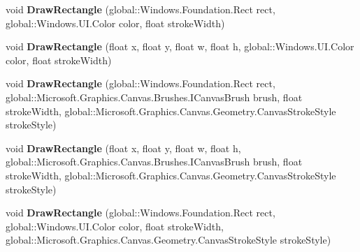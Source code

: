 \begin{DoxyCompactItemize}
\mbox{\label{class_microsoft_1_1_graphics_1_1_canvas_1_1_canvas_drawing_session_a02eb48c19bee3958a06857db78ccc690}} 
void {\bfseries Draw\+Rectangle} (global\+::\+Windows.\+Foundation.\+Rect rect, global\+::\+Windows.\+U\+I.\+Color color, float stroke\+Width)
\item 
\mbox{\label{class_microsoft_1_1_graphics_1_1_canvas_1_1_canvas_drawing_session_a28a64f9f29f0edaaa2016023bf267d2e}} 
void {\bfseries Draw\+Rectangle} (float x, float y, float w, float h, global\+::\+Windows.\+U\+I.\+Color color, float stroke\+Width)
\item 
\mbox{\label{class_microsoft_1_1_graphics_1_1_canvas_1_1_canvas_drawing_session_a77c25d21ef99cb3a408ceec333dd119b}} 
void {\bfseries Draw\+Rectangle} (global\+::\+Windows.\+Foundation.\+Rect rect, global\+::\+Microsoft.\+Graphics.\+Canvas.\+Brushes.\+I\+Canvas\+Brush brush, float stroke\+Width, global\+::\+Microsoft.\+Graphics.\+Canvas.\+Geometry.\+Canvas\+Stroke\+Style stroke\+Style)
\item 
\mbox{\label{class_microsoft_1_1_graphics_1_1_canvas_1_1_canvas_drawing_session_af4a31d2b87f5a4e8de01db53ff030ac7}} 
void {\bfseries Draw\+Rectangle} (float x, float y, float w, float h, global\+::\+Microsoft.\+Graphics.\+Canvas.\+Brushes.\+I\+Canvas\+Brush brush, float stroke\+Width, global\+::\+Microsoft.\+Graphics.\+Canvas.\+Geometry.\+Canvas\+Stroke\+Style stroke\+Style)
\item 
\mbox{\label{class_microsoft_1_1_graphics_1_1_canvas_1_1_canvas_drawing_session_a1df54d826ccf73b48a197a79d4dab761}} 
void {\bfseries Draw\+Rectangle} (global\+::\+Windows.\+Foundation.\+Rect rect, global\+::\+Windows.\+U\+I.\+Color color, float stroke\+Width, global\+::\+Microsoft.\+Graphics.\+Canvas.\+Geometry.\+Canvas\+Stroke\+Style stroke\+Style)
\item 
\mbox{\label{class_microsoft_1_1_graphics_1_1_canvas_1_1_canvas_drawing_session_af488d343e41a8735d50be1cb53d69238}} 

\end{DoxyCompactItemize}
